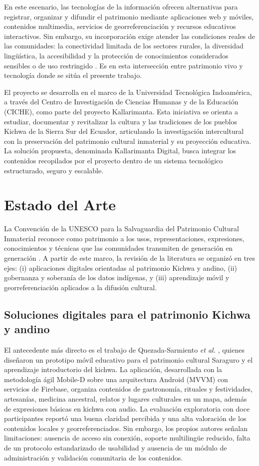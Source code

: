 En este escenario, las tecnologías de la información ofrecen alternativas para registrar, organizar y difundir el patrimonio mediante aplicaciones web y móviles, contenidos multimedia, servicios de georreferenciación y recursos educativos interactivos. Sin embargo, su incorporación exige atender las condiciones reales de las comunidades: la conectividad limitada de los sectores rurales, la diversidad lingüística, la accesibilidad y la protección de conocimientos considerados sensibles o de uso restringido \cite{christen2012information}. Es en esta intersección entre patrimonio vivo y tecnología donde se sitúa el presente trabajo.

El proyecto se desarrolla en el marco de la Universidad Tecnológica Indoamérica, a través del Centro de Investigación de Ciencias Humanas y de la Educación (CICHE), como parte del proyecto Kallarimanta. Esta iniciativa se orienta a estudiar, documentar y revitalizar la cultura y las tradiciones de los pueblos Kichwa de la Sierra Sur del Ecuador, articulando la investigación intercultural con la preservación del patrimonio cultural inmaterial y su proyección educativa. La solución propuesta, denominada Kallarimanta Digital, busca integrar los contenidos recopilados por el proyecto dentro de un sistema tecnológico estructurado, seguro y escalable.


\section{Estado del Arte}
La Convención de la UNESCO para la Salvaguardia del Patrimonio Cultural Inmaterial reconoce como patrimonio a los usos, representaciones, expresiones, conocimientos y técnicas que las comunidades transmiten de generación en generación \cite{unesco2003convencion}. A partir de este marco, la revisión de la literatura se organizó en tres ejes: (i) aplicaciones digitales orientadas al patrimonio Kichwa y andino, (ii) gobernanza y soberanía de los datos indígenas, y (iii) aprendizaje móvil y georreferenciación aplicados a la difusión cultural.

\subsection{Soluciones digitales para el patrimonio Kichwa y andino}
El antecedente más directo es el trabajo de Quezada-Sarmiento \textit{et al.} \cite{quezada2026mobile}, quienes diseñaron un prototipo móvil educativo para el patrimonio cultural Saraguro y el aprendizaje introductorio del kichwa. La aplicación, desarrollada con la metodología ágil Mobile-D \cite{abrahamsson2004mobiled} sobre una arquitectura Android (MVVM) con servicios de Firebase, organiza contenidos de gastronomía, rituales y festividades, artesanías, medicina ancestral, relatos y lugares culturales en un mapa, además de expresiones básicas en kichwa con audio. La evaluación exploratoria con doce participantes reportó una buena claridad percibida y una alta valoración de los contenidos locales y georreferenciados. Sin embargo, los propios autores señalan limitaciones: ausencia de acceso sin conexión, soporte multilingüe reducido, falta de un protocolo estandarizado de usabilidad y ausencia de un módulo de administración y validación comunitaria de los contenidos.

